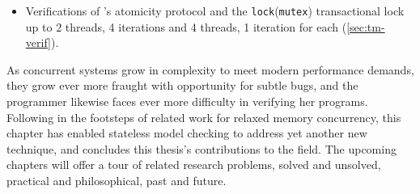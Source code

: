 {\begin{itemize}
		abort code reduction (\cref{sec:tm-eval-stm})
		and abstraction reduction (\cref{sec:tm-abstraction})
		which rely on human intuition to ensure their soundness
		to tackle even larger state spaces still.
	\item Verifications of 's atomicity protocol %
		and the {\tt lock}({\tt mutex}) transactional lock %
		up to 2 threads, 4 iterations and 4 threads, 1 iteration for each
		(\cref{sec:tm-verif}).
\end{itemize}

As concurrent systems grow in complexity to meet modern performance demands,
they grow ever more fraught with opportunity for subtle bugs,
and the programmer likewise faces ever more difficulty in verifying her programs.
Following in the footsteps of related work for relaxed memory concurrency,
this chapter has enabled stateless model checking to address yet another new technique,
and concludes this thesis's contributions to the field.
The upcoming chapters will offer a tour of related research problems,
solved and unsolved,
practical and philosophical,
past and future.

}

